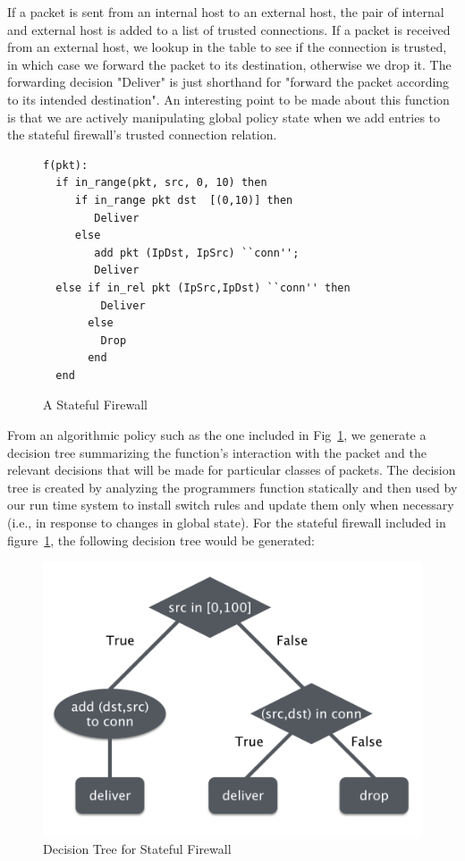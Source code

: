 \documentclass[preprint]{sigplanconf}
\begin{document}
If a packet is sent from an internal host to an external host, the pair of internal and external host is added to a list of trusted connections. If a packet is received from an external host, we lookup in the table to see if the connection is trusted, in which case we forward the packet to its destination, otherwise we drop it. The forwarding decision "Deliver" is just shorthand for "forward the packet according to its intended destination".
An interesting point to be made about this function is that we are actively manipulating global policy state when we add entries to the stateful firewall's trusted connection relation.


\begin{figure}[ht]
\begin{lstlisting}
f(pkt):
  if in_range(pkt, src, 0, 10) then
     if in_range pkt dst  [(0,10)] then
        Deliver
     else 
        add pkt (IpDst, IpSrc) ``conn'';
        Deliver
  else if in_rel pkt (IpSrc,IpDst) ``conn'' then
         Deliver
       else
         Drop
       end
  end                
  \end{lstlisting}

\caption{A Stateful Firewall}
\label{fig:firewallcode}
\end{figure}

From an algorithmic policy such as the one included in Fig~\ref{fig:firewallcode}, we generate a decision tree summarizing the function's interaction with the packet and the relevant decisions that will be made for particular classes of packets. The decision tree is created by analyzing the programmers function statically and then used by our run time system to install switch rules and update them only when necessary (i.e., in response to changes in global state). For the stateful firewall included in figure~\ref{fig:firewallcode}, the following decision tree would be generated:


\begin{figure}[ht]
\includegraphics[scale=.5]{img/dtree.png}
\caption{Decision Tree for Stateful Firewall}     
\label{fig:decisiontree}  
  \end{figure}
\end{document}
